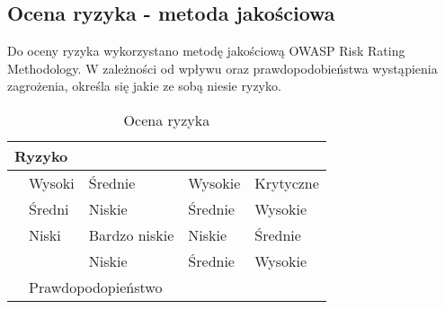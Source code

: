 \subsection{Ocena ryzyka - metoda jakościowa}
Do oceny ryzyka wykorzystano metodę jakościową OWASP Risk Rating Methodology. W zależności od wpływu oraz prawdopodobieństwa wystąpienia zagrożenia, określa się jakie ze sobą niesie ryzyko. 
\begin{table}[!ht]
	\centering
	\caption{Ocena ryzyka}
	\label{ocenaRyzyka}
	\begin{tabular}{|l|l|l|l|l|}
		\hline 
		\multicolumn{5}{|l|}{Ryzyko}        \\ \hline
		\multirow{4}{*}{} & Wysoki    	& Średnie    &  Wysokie   & Krytyczne     \\ \cline{2-5} 
				Wpływ	  & Średni   	& Niskie    & Średnie    &  Wysokie   \\ \cline{2-5}
						  & Niski  		& Bardzo niskie    & Niskie    & Średnie    \\ \cline{2-5}
						  &     		& Niskie   & Średnie    &  Wysokie    \\ \hline
			& \multicolumn{4}{l|}{Prawdopodopieństwo}  \\  \hline 
	\end{tabular}
\end{table}
% 
